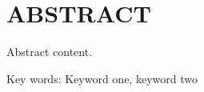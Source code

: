 %
%
%


\chapter*{ABSTRACT}


\singlespacing

\vspace*{0.5cm}

\noindent Abstract content.

\vspace*{0.2cm}

\noindent Key words: Keyword one, keyword two

\newpage
